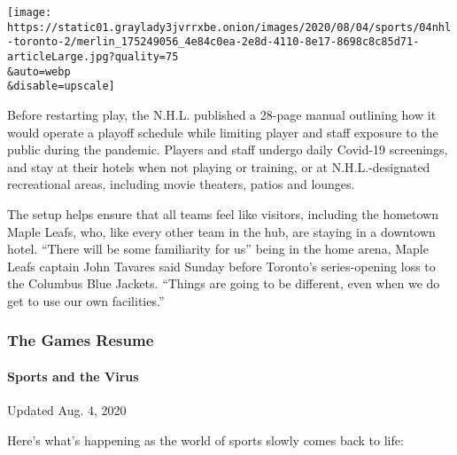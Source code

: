 \texttt{[image: https://static01.graylady3jvrrxbe.onion/images/2020/08/04/sports/04nhl-toronto-2/merlin\_175249056\_4e84c0ea-2e8d-4110-8e17-8698c8c85d71-articleLarge.jpg?quality=75\\\&auto=webp\\\&disable=upscale]}

Before restarting play, the N.H.L. published a 28-page manual outlining
how it would operate a playoff schedule while limiting player and staff
exposure to the public during the pandemic. Players and staff undergo
daily Covid-19 screenings, and stay at their hotels when not playing or
training, or at N.H.L.-designated recreational areas, including movie
theaters, patios and lounges.

The setup helps ensure that all teams feel like visitors, including the
hometown Maple Leafs, who, like every other team in the hub, are staying
in a downtown hotel. ``There will be some familiarity for us'' being in
the home arena, Maple Leafs captain John Tavares said Sunday before
Toronto's series-opening loss to the Columbus Blue Jackets. ``Things are
going to be different, even when we do get to use our own facilities.''

\hypertarget{the-games-resume}{%
\subsubsection{The Games Resume}\label{the-games-resume}}

\hypertarget{sports-and-the-virus}{%
\paragraph{Sports and the Virus}\label{sports-and-the-virus}}

Updated Aug. 4, 2020

Here's what's happening as the world of sports slowly comes back to
life:


